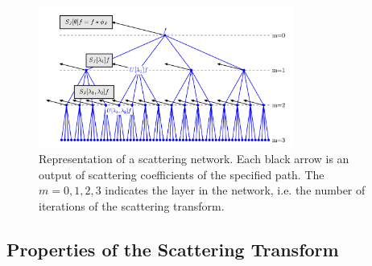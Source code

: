 \begin{figure}[!htb]
	\centering
	\includegraphics[width = 0.75\textwidth]{images/scattering_network.png}
	\caption{Representation of a scattering network. Each black arrow is an output of scattering coefficients of the specified path. The $m=0,1,2,3$ indicates the layer in the network, i.e. the number of iterations of the scattering transform.}
	\label{fig:scattering_network}
\end{figure}


\subsection{Properties of the Scattering Transform}


